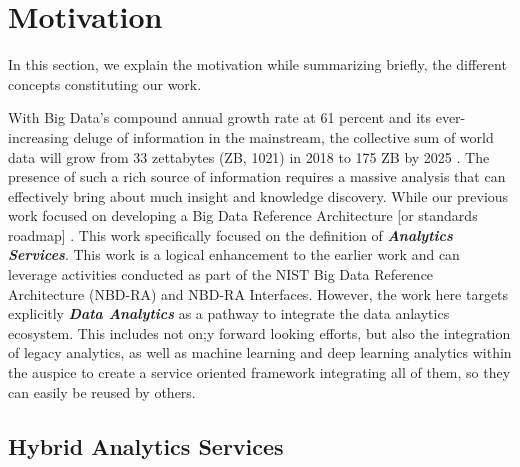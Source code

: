 


\section{Motivation}\label{s:background}

In this section, we explain the motivation while summarizing briefly,
the different concepts constituting our work.

With Big Data's compound annual growth rate at 61 percent and its
ever-increasing deluge of information in the mainstream, the
collective sum of world data will grow from 33 zettabytes (ZB, 1021)
in 2018 to 175 ZB by 2025 . The presence of such a rich source of information requires a
massive analysis that can effectively bring about much insight and
knowledge discovery. While our previous work focused on developing a
Big Data Reference Architecture [or standards roadmap] \cite{??}. This
work specifically focused on the definition of {\bf\em Analytics
Services}.  This work is a logical enhancement to the earlier work and
can leverage activities conducted as part of the NIST Big Data
Reference Architecture (NBD-RA) and NBD-RA Interfaces.  However, the
work here targets explicitly {\bf\em Data Analytics} as a pathway to
integrate the data anlaytics ecosystem. This includes not on;y forward
looking efforts, but also the integration of legacy analytics, as well
as machine learning and deep learning analytics within the auspice to
create a service oriented framework integrating all of them, so they
can easily be reused by others.


\subsection{Hybrid Analytics Services}

